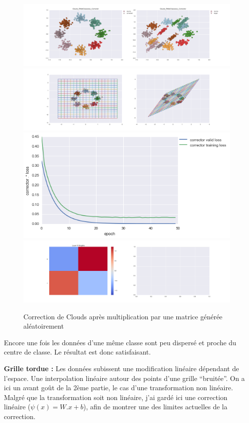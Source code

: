 \begin{figure}[H] %
\centering
\includegraphics[width=\linewidth]{fig/24-05-2016/clouds/Clouds_RMatClasswise_Corrector-DATA.png}
\includegraphics[width=\linewidth]{fig/24-05-2016/clouds/Clouds_RMatClasswise_Corrector-GridCheck.png}
\includegraphics[width=0.45\linewidth]{fig/24-05-2016/clouds/Clouds_RMatClasswise_Corrector-Learning_curve.png}
\includegraphics[width=\linewidth]{fig/24-05-2016/clouds/Clouds_RMatClasswise_Corrector-W.png}
\caption{Correction de Clouds après multiplication par une matrice générée aléatoirement}
\label{fig:recap-clouds-RMat-classwise}
\end{figure}

Encore une fois les données d'une même classe sont peu dispersé et proche du centre de classe. 
Le résultat est donc satisfaisant.

{\Large \textbf{Grille tordue :}} Les données subissent une modification linéaire dépendant de l'espace.
Une interpolation linéaire autour des points d'une grille ``bruitée''.
On a ici un avant goût de la 2ème partie, le cas d'une transformation non linéaire.
Malgré que la transformation soit non linéaire, j'ai gardé ici une correction linéaire ($\psi(x) = W.x+b$),
afin de montrer une des limites actuelles de la correction.

